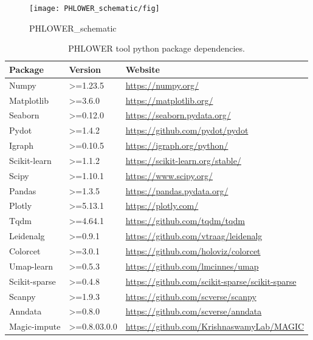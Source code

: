 \begin{figure}[!ht]
	\centering
	\texttt{[image: PHLOWER\_schematic/fig]}
	\vspace{0.1cm}
	\caption[PHLOWER\_schematic.]{PHLOWER\_schematic}
	\label{fig:PHLOWER_schematic}
\end{figure}

\begin{table}[!ht]
	\centering
	\begin{tabular}{lll}
		\toprule
		\textbf{Package} & \textbf{Version} & \textbf{Website} \\
		\midrule
			Numpy& >=1.23.5 & \url{https://numpy.org/} \\
			Matplotlib& >=3.6.0 & \url{https://matplotlib.org/} \\
			Seaborn& >=0.12.0 & \url{https://seaborn.pydata.org/} \\
			Pydot& >=1.4.2 & \url{https://github.com/pydot/pydot} \\
			Igraph& >=0.10.5 & \url{https://igraph.org/python/} \\
			Scikit-learn& >=1.1.2 & \url{https://scikit-learn.org/stable/} \\
			Scipy& >=1.10.1 & \url{https://www.scipy.org/} \\
			Pandas& >=1.3.5 & \url{https://pandas.pydata.org/} \\
			Plotly& >=5.13.1 & \url{https://plotly.com/} \\
			Tqdm& >=4.64.1 & \url{https://github.com/tqdm/tqdm} \\
			Leidenalg& >=0.9.1 & \url{https://github.com/vtraag/leidenalg} \\
			Colorcet& >=3.0.1 & \url{https://github.com/holoviz/colorcet} \\
			Umap-learn& >=0.5.3 & \url{https://github.com/lmcinnes/umap} \\
			Scikit-sparse& >=0.4.8 & \url{https://github.com/scikit-sparse/scikit-sparse} \\
			Scanpy& >=1.9.3 & \url{https://github.com/scverse/scanpy} \\
			Anndata& >=0.8.0 & \url{https://github.com/scverse/anndata} \\
            Magic-impute & >=0.8.03.0.0 & \url{https://github.com/KrishnaswamyLab/MAGIC}\\
		\bottomrule
	\end{tabular}
	\vspace{0.1cm}
	\caption[PHLOWER tool python package dependencies]{PHLOWER tool python package dependencies.}
	\label{tab:phlower_python_dependencies}
\end{table}

